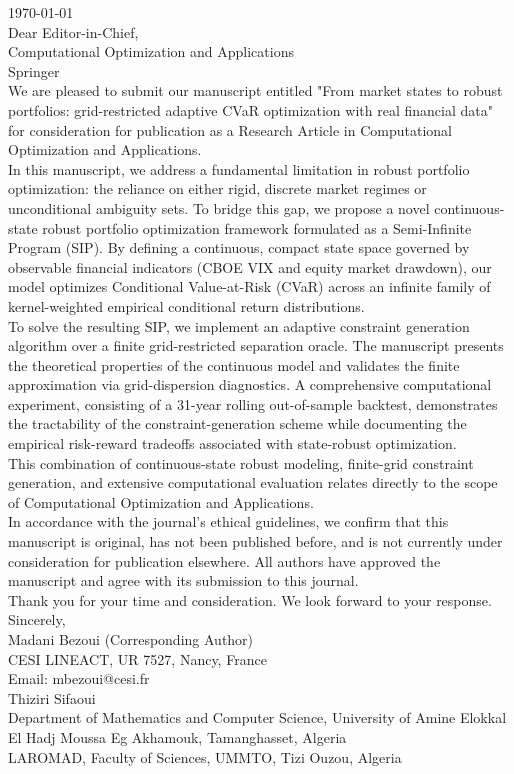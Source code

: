 \documentclass[11pt, a4paper]{article}
\begin{document}
\noindent \today\\[1cm]
Dear Editor-in-Chief,\\
Computational Optimization and Applications\\
Springer\\[0.5cm]
We are pleased to submit our manuscript entitled "From market states to robust portfolios: grid-restricted adaptive CVaR optimization with real financial data" for consideration for publication as a Research Article in Computational Optimization and Applications.\\[0.3cm]
In this manuscript, we address a fundamental limitation in robust portfolio optimization: the reliance on either rigid, discrete market regimes or unconditional ambiguity sets. To bridge this gap, we propose a novel continuous-state robust portfolio optimization framework formulated as a Semi-Infinite Program (SIP). By defining a continuous, compact state space governed by observable financial indicators (CBOE VIX and equity market drawdown), our model optimizes Conditional Value-at-Risk (CVaR) across an infinite family of kernel-weighted empirical conditional return distributions.\\[0.3cm]
To solve the resulting SIP, we implement an adaptive constraint generation algorithm over a finite grid-restricted separation oracle. The manuscript presents the theoretical properties of the continuous model and validates the finite approximation via grid-dispersion diagnostics. A comprehensive computational experiment, consisting of a 31-year rolling out-of-sample backtest, demonstrates the tractability of the constraint-generation scheme while documenting the empirical risk-reward tradeoffs associated with state-robust optimization.\\[0.3cm]
This combination of continuous-state robust modeling, finite-grid constraint generation, and extensive computational evaluation relates directly to the scope of Computational Optimization and Applications.\\[0.3cm]
In accordance with the journal's ethical guidelines, we confirm that this manuscript is original, has not been published before, and is not currently under consideration for publication elsewhere. All authors have approved the manuscript and agree with its submission to this journal.\\[0.5cm]
Thank you for your time and consideration. We look forward to your response.\\[1cm]
Sincerely,\\[0.5cm]
Madani Bezoui (Corresponding Author)\\
CESI LINEACT, UR 7527, Nancy, France\\
Email: mbezoui@cesi.fr\\[0.5cm]
Thiziri Sifaoui\\
Department of Mathematics and Computer Science, University of Amine Elokkal El Hadj Moussa Eg Akhamouk, Tamanghasset, Algeria\\
LAROMAD, Faculty of Sciences, UMMTO, Tizi Ouzou, Algeria
\end{document}
